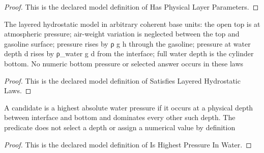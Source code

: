 \begin{proof}
  This is the declared model definition of Has Physical Layer Parameters.
\end{proof}
\begin{definition}
  \label{def:physics:phyx-mini-0663:phyxminiproblems-problemphyxmini0663-satisfieslayeredhydrostaticlaws}
  The layered hydrostatic model in arbitrary coherent base units: the open top is at atmospheric pressure; air-weight variation is neglected between the top and gasoline surface; pressure rises by ρ g h through the gasoline; pressure at water depth d rises by ρ\_water g d from the interface; full water depth is the cylinder bottom. No numeric bottom pressure or selected answer occurs in these laws
\end{definition}
\begin{proof}
  This is the declared model definition of Satisfies Layered Hydrostatic Laws.
\end{proof}
\begin{definition}
  \label{def:physics:phyx-mini-0663:phyxminiproblems-problemphyxmini0663-ishighestpressureinwater}
  A candidate is a highest absolute water pressure if it occurs at a physical depth between interface and bottom and dominates every other such depth. The predicate does not select a depth or assign a numerical value by definition
\end{definition}
\begin{proof}
  This is the declared model definition of Is Highest Pressure In Water.
\end{proof}

